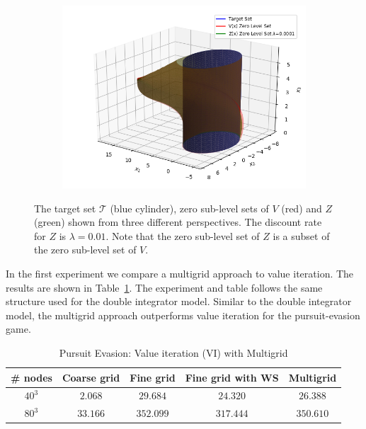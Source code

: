 \begin{figure}[h]
\begin{subfigure}[t]{0.3\textwidth}
        \includegraphics[trim= 3cm 0cm 0cm 0cm, clip=true, scale=0.45]{air_3d_v3}
    \end{subfigure}%
    \caption{The target set $\mathcal{T}$ (blue cylinder), zero sub-level sets of $V$ (red) and $Z$ (green) shown from three different perspectives. The discount rate for $Z$ is $\lambda=0.01$. Note that the zero sub-level set of $Z$ is a subset of the zero sub-level set of $V$.}
    \label{fig:air3D}
\end{figure}

In the first experiment we compare a multigrid approach to value iteration.  The results are shown in Table~\ref{tab:multigrid_pe}. The experiment and table follows the same structure used for the double integrator model. Similar to the double integrator model, the multigrid approach outperforms value iteration for the pursuit-evasion game.

\begin{table}
\centering
\caption{Pursuit Evasion: Value iteration (VI) with Multigrid}
\begin{tabular}{|c| c| c| c| c| }
\hline
\# nodes & Coarse grid & Fine grid &  Fine grid with WS & Multigrid \\ \hline
$40^3$ & $2.068$ & $29.684$ & $24.320$ & $26.388$ \\ \hline
$80^3$ & $33.166$ & $352.099$ & $317.444$ & $350.610$\\ \hline
\end{tabular}
\label{tab:multigrid_pe}
\end{table}

